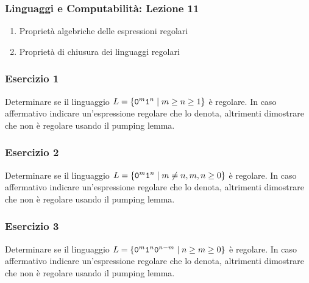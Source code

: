 




\begin{frame}[fragile]
	\frametitle{Linguaggi e Computabilità: Lezione 11}
\begin{enumerate}
\item
Proprietà algebriche delle espressioni regolari
\item
Proprietà di chiusura dei linguaggi regolari
\end{enumerate}
\end{frame}

\begin{frame}
\frametitle{Esercizio 1}
Determinare se il linguaggio $L = \{ \mathtt{0}^{m}  \mathtt{1}^{n} \; \vert \; m\ge n \ge 1 \}$ è regolare.
In caso affermativo indicare un'espressione regolare che lo denota, altrimenti dimostrare che non è regolare usando il pumping lemma.
\end{frame}

\begin{frame}
\frametitle{Esercizio 2}
Determinare se il linguaggio $L = \{ \mathtt{0}^{m}  \mathtt{1}^{n} \; \vert \; m\neq n, m,n \ge 0 \}$ è regolare.
In caso affermativo indicare un'espressione regolare che lo denota, altrimenti dimostrare che non è regolare usando il pumping lemma.
\end{frame}

\begin{frame}
\frametitle{Esercizio 3}
Determinare se il linguaggio $L = \{ \mathtt{0}^{m}  \mathtt{1}^{n} \mathtt{0}^{n-m}\; \vert \; n\ge m \ge 0 \}$ è regolare.
In caso affermativo indicare un'espressione regolare che lo denota, altrimenti dimostrare che non è regolare usando il pumping lemma.
\end{frame}


